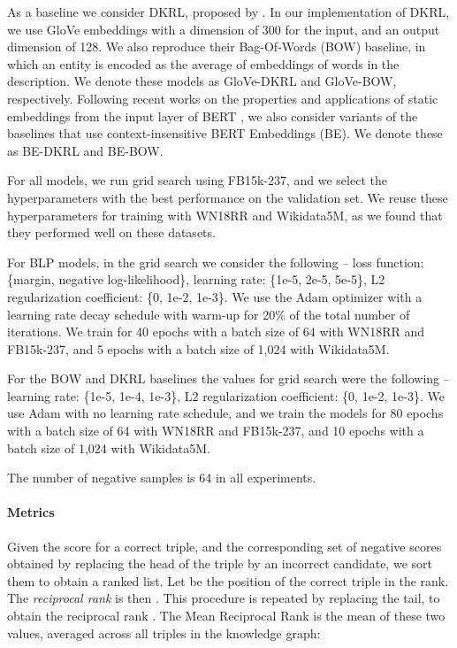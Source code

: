 \documentclass[sigconf]{acmart}
\begin{document}
As a baseline we consider DKRL, proposed by \citet{xie2016RepresentationLO}. In our implementation of DKRL, we use GloVe embeddings \citep{pennington2014glove} with a dimension of 300 for the input, and an output dimension of 128. We also reproduce their Bag-Of-Words (BOW) baseline, in which an entity is encoded as the average of embeddings of words in the description. We denote these models as GloVe-DKRL and GloVe-BOW, respectively. Following recent works on the properties and applications of static embeddings from the input layer of BERT \citep{peters2018dissecting,jawahar2019bertlang}, we also consider variants of the baselines that use context-insensitive BERT Embeddings (BE). We denote these as BE-DKRL and BE-BOW.

For all models, we run grid search using FB15k-237, and we select the hyperparameters with the best performance on the validation set. We reuse these hyperparameters for training with WN18RR and Wikidata5M, as we found that they performed well on these datasets.

For BLP models, in the grid search we consider the following -- loss function: \{margin, negative log-likelihood\}, learning rate: \{1e-5, 2e-5, 5e-5\}, L2 regularization coefficient: \{0, 1e-2, 1e-3\}. We use the Adam optimizer with a learning rate decay schedule with warm-up for 20\% of the total number of iterations. We train for 40 epochs with a batch size of 64 with WN18RR and FB15k-237, and 5 epochs with a batch size of 1,024 with Wikidata5M.

For the BOW and DKRL baselines the values for grid search were the following -- learning rate: \{1e-5, 1e-4, 1e-3\}, L2 regularization coefficient: \{0, 1e-2, 1e-3\}. We use Adam with no learning rate schedule, and we train the models for 80 epochs with a batch size of 64 with WN18RR and FB15k-237, and 10 epochs with a batch size of 1,024 with Wikidata5M.

The number of negative samples is 64 in all experiments.

\paragraph{Metrics} Given the score for a correct triple, and the corresponding set of negative scores obtained by replacing the head of the triple by an incorrect candidate, we sort them to obtain a ranked list. Let  be the position of the correct triple in the rank. The \textit{reciprocal rank} is then . This procedure is repeated by replacing the tail, to obtain the reciprocal rank . The Mean Reciprocal Rank is the mean of these two values, averaged across all triples in the knowledge graph:
\end{document}
